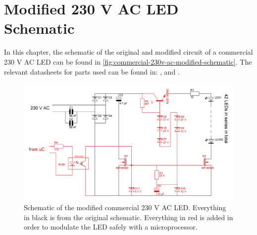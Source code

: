 
\chapter{Modified 230 V AC LED Schematic}
\label{app:commercial-230v-ac-modified-schematic}

In this chapter, the schematic of the original and modified circuit of a commercial 230 V AC LED can be found in \autoref{fig:commercial-230v-ac-modified-schematic}.
The relevant datasheets for parts used can be found in: \cite{4n35-optocoupler-datasheet}, \cite{mth6n60-n-power-fet-datasheet} and \cite{mje13009g-npn-power-transistor-datasheet}.


\begin{figure}[htb]
	\includegraphics[angle=90,width=\textwidth,height=.9\textheight,keepaspectratio]{chapters/appendix/commercial-230v-ac-modified-schematic/commercial-230v-ac-modified-schematic.jpg}
	\caption{Schematic of the modified commercial 230 V AC LED. Everything in black is from the original schematic. Everything in red is added in order to modulate the LED safely with a microprocessor.}
	\label{fig:commercial-230v-ac-modified-schematic}
\end{figure}

